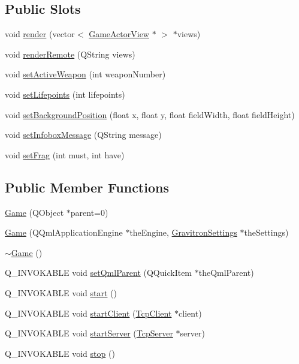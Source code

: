 \subsection*{Public Slots}
\begin{DoxyCompactItemize}
\item 
void \hyperlink{class_game_a645389b61e4d2fb43691208651c5a4e2}{render} (vector$<$ \hyperlink{class_game_actor_view}{Game\+Actor\+View} $\ast$ $>$ $\ast$views)
\item 
void \hyperlink{class_game_aab513bbe5db45b1f9dba205d0ddec74e}{render\+Remote} (Q\+String views)
\item 
void \hyperlink{class_game_a226a897819cb653c61868cbf96b90ad5}{set\+Active\+Weapon} (int weapon\+Number)
\item 
void \hyperlink{class_game_a60ef32ef5040d639aaae74c74466e186}{set\+Lifepoints} (int lifepoints)
\item 
void \hyperlink{class_game_a9955838a261e9c1aee21bc6746f11f4f}{set\+Background\+Position} (float x, float y, float field\+Width, float field\+Height)
\item 
void \hyperlink{class_game_a59f88c64cc14f60ec2d7d3f94d1e00e7}{set\+Infobox\+Message} (Q\+String message)
\item 
void \hyperlink{class_game_a8cbceafcfbb9fe7d67827c428f8f0ee6}{set\+Frag} (int must, int have)
\end{DoxyCompactItemize}
\subsection*{Public Member Functions}
\begin{DoxyCompactItemize}
\item 
\hyperlink{class_game_a1875963fc898101a29d47084aebffa28}{Game} (Q\+Object $\ast$parent=0)
\item 
\hyperlink{class_game_ad313f2a005b48ec21f3c56b8b9ed0fe4}{Game} (Q\+Qml\+Application\+Engine $\ast$the\+Engine, \hyperlink{class_gravitron_settings}{Gravitron\+Settings} $\ast$the\+Settings)
\item 
\hyperlink{class_game_ae3d112ca6e0e55150d2fdbc704474530}{$\sim$\+Game} ()
\item 
Q\+\_\+\+I\+N\+V\+O\+K\+A\+B\+L\+E void \hyperlink{class_game_ac7edf2d1ecf3e7e450a5c2b5489945f0}{set\+Qml\+Parent} (Q\+Quick\+Item $\ast$the\+Qml\+Parent)
\item 
Q\+\_\+\+I\+N\+V\+O\+K\+A\+B\+L\+E void \hyperlink{class_game_a3d9b98f7c4a96ecf578f75b96c9f0e90}{start} ()
\item 
Q\+\_\+\+I\+N\+V\+O\+K\+A\+B\+L\+E void \hyperlink{class_game_a887fc8d85fac4fa26587bd2adb2d3ba0}{start\+Client} (\hyperlink{class_tcp_client}{Tcp\+Client} $\ast$client)
\item 
Q\+\_\+\+I\+N\+V\+O\+K\+A\+B\+L\+E void \hyperlink{class_game_aacc6760ef923294d17927557faa3826f}{start\+Server} (\hyperlink{class_tcp_server}{Tcp\+Server} $\ast$server)
\item 
Q\+\_\+\+I\+N\+V\+O\+K\+A\+B\+L\+E void \hyperlink{class_game_a17fbb36fd4a2085f9ff4f1fa93d7d08b}{stop} ()
\end{DoxyCompactItemize}


